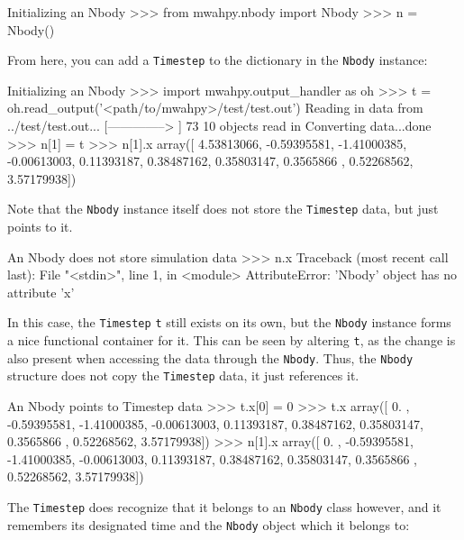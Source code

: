 \documentclass{article}
\begin{document}
\begin{codelisting}{Initializing an Nbody}
>>> from mwahpy.nbody import Nbody
>>> n = Nbody()
\end{codelisting}

From here, you can add a \verb!Timestep! to the dictionary in the \verb!Nbody! instance:\\

\begin{codelisting}{Initializing an Nbody}
>>> import mwahpy.output_handler as oh
>>> t = oh.read_output('<path/to/mwahpy>/test/test.out')
Reading in data from ../test/test.out...
[-------------->     ] 73%
10 objects read in
Converting data...done
>>> n[1] = t
>>> n[1].x
array([ 4.53813066, -0.59395581, -1.41000385, -0.00613003,  0.11393187,
        0.38487162,  0.35803147,  0.3565866 ,  0.52268562,  3.57179938])
\end{codelisting}

Note that the \verb!Nbody! instance itself does not store the \verb!Timestep! data, but just points to it. \\

\begin{codelisting}{An Nbody does not store simulation data}
>>> n.x
Traceback (most recent call last):
  File "<stdin>", line 1, in <module>
AttributeError: 'Nbody' object has no attribute 'x'
\end{codelisting}

In this case, the \verb!Timestep! \verb!t! still exists on its own, but the \verb!Nbody! instance forms a nice functional container for it. This can be seen by altering \verb!t!, as the change is also present when accessing the data through the \verb!Nbody!. Thus, the \verb!Nbody! structure does not copy the \verb!Timestep! data, it just references it. \\

\begin{codelisting}{An Nbody points to Timestep data}
>>> t.x[0] = 0
>>> t.x
array([ 0.        , -0.59395581, -1.41000385, -0.00613003,  0.11393187,
        0.38487162,  0.35803147,  0.3565866 ,  0.52268562,  3.57179938])
>>> n[1].x
array([ 0.        , -0.59395581, -1.41000385, -0.00613003,  0.11393187,
        0.38487162,  0.35803147,  0.3565866 ,  0.52268562,  3.57179938])
\end{codelisting}

The \verb!Timestep! does recognize that it belongs to an \verb!Nbody! class however, and it remembers its designated time and the \verb!Nbody! object which it belongs to: \\
\end{document}
